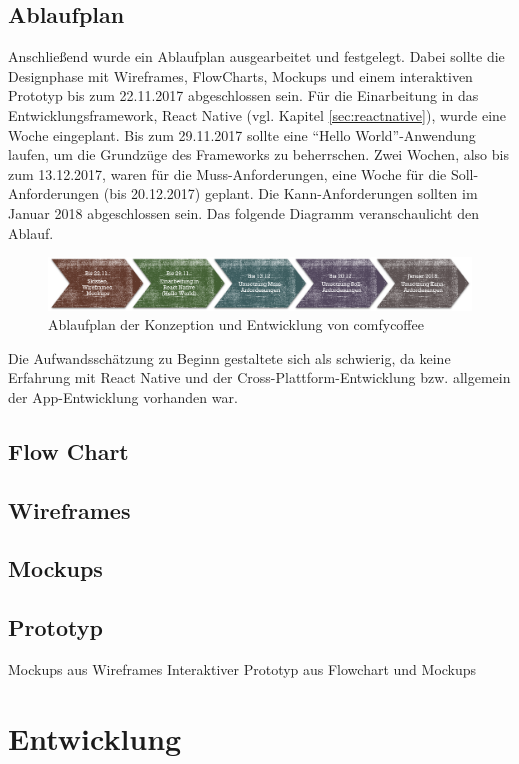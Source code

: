 \section{Ablaufplan}
\label{sec:ablaufplan}
Anschließend wurde ein Ablaufplan ausgearbeitet und festgelegt. Dabei sollte die Designphase mit Wireframes, FlowCharts, Mockups und einem interaktiven Prototyp bis zum 22.11.2017 abgeschlossen sein. Für die Einarbeitung in das Entwicklungsframework, React Native (vgl. Kapitel \ref{sec:reactnative}), wurde eine Woche eingeplant. Bis zum 29.11.2017 sollte eine ``Hello World''-Anwendung laufen, um die Grundzüge des Frameworks zu beherrschen. Zwei Wochen, also bis zum 13.12.2017, waren für die Muss-Anforderungen, eine Woche für die Soll-Anforderungen (bis 20.12.2017) geplant. Die Kann-Anforderungen sollten im Januar 2018 abgeschlossen sein. Das folgende Diagramm veranschaulicht den Ablauf.

\begin{figure}[h]
    \centering
		\includegraphics{Bilder/ablaufplan.png}
		\caption{Ablaufplan der Konzeption und Entwicklung von comfycoffee}
\end{figure}

Die Aufwandsschätzung zu Beginn gestaltete sich als schwierig, da keine Erfahrung mit React Native und der Cross-Plattform-Entwicklung bzw. allgemein der App-Entwicklung vorhanden war.

\section{Flow Chart}
\section{Wireframes}
\section{Mockups}
\section{Prototyp}
Mockups aus Wireframes
Interaktiver Prototyp aus Flowchart und Mockups




\chapter{Entwicklung}
\label{entwicklung}


